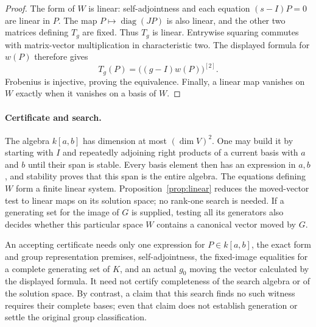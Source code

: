 \documentclass[11pt]{article}
\begin{document}
\begin{proof}
The form of $W$ is linear: self-adjointness and each equation
$(s-I)P=0$ are linear in $P$.  The map $P\mapsto\operatorname{diag}(JP)$
is also linear, and the other two matrices defining $T_g$ are fixed.
Thus $T_g$ is linear.  Entrywise squaring commutes with matrix-vector
multiplication in characteristic two.  The displayed formula for $w(P)$
therefore gives
\[
                   T_g(P)=\bigl((g-I)w(P)\bigr)^{[2]}.
\]
Frobenius is injective, proving the equivalence.  Finally, a linear map
vanishes on $W$ exactly when it vanishes on a basis of $W$.
\end{proof}

\paragraph{Certificate and search.}
The algebra $k[a,b]$ has dimension at most $(\dim V)^2$.  One may build
it by starting with $I$ and repeatedly adjoining right products of a
current basis with $a$ and $b$ until their span is stable.  Every basis
element then has an expression in $a,b$, and stability proves that this
span is the entire algebra.  The equations defining $W$ form a finite
linear system.  Proposition~\ref{prop:linear} reduces the moved-vector
test to linear maps on its solution space; no rank-one search is needed.
If a generating set for the image of $G$ is supplied, testing all its
generators also decides whether this particular space $W$ contains a
canonical vector moved by $G$.

An accepting certificate needs only one expression for $P\in k[a,b]$,
the exact form and group representation premises, self-adjointness, the
fixed-image equalities for a complete generating set of $K$, and an actual
$g_0$ moving the vector calculated by the displayed formula.  It need not
certify completeness of the search algebra or of the solution space.
By contrast, a claim that this search finds no such witness requires
their complete bases; even that claim does not establish generation or
settle the original group classification.
\end{document}
